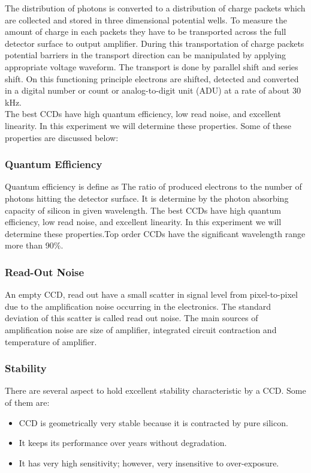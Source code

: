 The distribution of photons is converted to a distribution of charge packets which are collected and stored in three dimensional potential wells. To measure the amount of charge in each packets they have to be transported across the full detector surface to output amplifier. During this transportation of charge packets potential barriers in the transport direction can be manipulated by applying appropriate voltage waveform. The transport is done by parallel shift and series shift. On this functioning principle electrons are shifted, detected and converted in a digital number or count or analog-to-digit unit (ADU) at a rate of about 30 kHz. \\ 

The best CCDs have high quantum efficiency, low read noise, and excellent linearity. In this experiment we will determine these properties. Some of these properties are discussed below:

\subsubsection{Quantum Efficiency}
Quantum efficiency is define as The ratio of produced electrons to the number of photons hitting the detector surface. It is determine by the photon absorbing capacity of silicon in given wavelength. The best CCDs have high quantum efficiency, low read noise, and excellent linearity. In this experiment we will determine these properties.Top order CCDs have the significant wavelength range more than 90$\% $.

\subsubsection{Read-Out Noise}
An empty CCD, read out have a small scatter in signal level from pixel-to-pixel due to the amplification noise occurring in the electronics. The standard deviation of this scatter is called read out noise. The main sources of amplification noise are size of amplifier, integrated circuit contraction and temperature of amplifier.

\subsubsection{Stability}
There are several aspect to hold excellent stability characteristic by a CCD. Some of them are:
\begin{itemize}
	\item  CCD is geometrically very stable because it is contracted by pure silicon.
	\item It keeps its performance over years without degradation.
	\item It has very high sensitivity; however, very insensitive to over-exposure.
\end{itemize}

